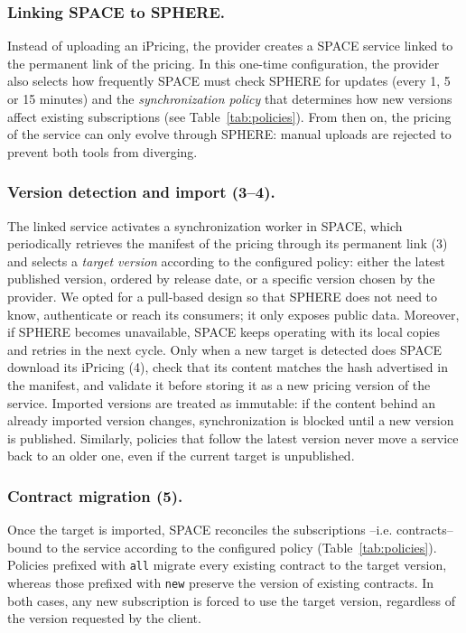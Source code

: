 \subsubsection{Linking SPACE to SPHERE.}
Instead of uploading an iPricing, the provider creates a SPACE service linked to the permanent link of the pricing. In this one-time configuration, the provider also selects how frequently SPACE must check SPHERE for updates (every 1, 5 or 15 minutes) and the \emph{synchronization policy} that determines how new versions affect existing subscriptions (see Table~\ref{tab:policies}). From then on, the pricing of the service can only evolve through SPHERE: manual uploads are rejected to prevent both tools from diverging.

\subsubsection{Version detection and import (3--4).}
The linked service activates a synchronization worker in SPACE, which periodically retrieves the manifest of the pricing through its permanent link (3) and selects a \emph{target version} according to the configured policy: either the latest published version, ordered by release date, or a specific version chosen by the provider. We opted for a pull-based design so that SPHERE does not need to know, authenticate or reach its consumers; it only exposes public data. Moreover, if SPHERE becomes unavailable, SPACE keeps operating with its local copies and retries in the next cycle. Only when a new target is detected does SPACE download its iPricing (4), check that its content matches the hash advertised in the manifest, and validate it before storing it as a new pricing version of the service. Imported versions are treated as immutable: if the content behind an already imported version changes, synchronization is blocked until a new version is published. Similarly, policies that follow the latest version never move a service back to an older one, even if the current target is unpublished.

\subsubsection{Contract migration (5).}
Once the target is imported, SPACE reconciles the subscriptions --i.e. contracts-- bound to the service according to the configured policy (Table~\ref{tab:policies}). Policies prefixed with \texttt{all} migrate every existing contract to the target version, whereas those prefixed with \texttt{new} preserve the version of existing contracts. In both cases, any new subscription is forced to use the target version, regardless of the version requested by the client.

